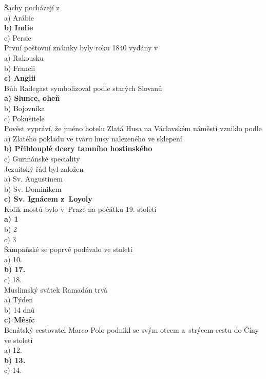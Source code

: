 \begin{multicols}{3}
\noindent
Šachy pocházejí z \\
a) Arábie\\
\textbf{b) Indie}\\
c) Persie\\

\noindent
První poštovní známky byly roku 1840 vydány v \\
a) Rakousku\\
b) Francii\\
\textbf{c) Anglii}\\

\noindent
Bůh Radegast symbolizoval podle starých Slovanů \\
\textbf{a) Slunce, oheň}\\
b) Bojovníka\\
c) Pokušitele\\

\noindent
Pověst vypráví, že jméno hotelu Zlatá Husa na Václavském náměstí 
vzniklo podle \\
a) Zlatého pokladu ve tvaru husy nalezeného ve sklepení\\
\textbf{b) Přihlouplé dcery tamního hostinského}\\
c) Gurmánské speciality\\

\noindent
Jezuitský řád byl založen \\
a) Sv. Augustinem\\
b) Sv. Dominikem\\
\textbf{c) Sv. Ignácem z~Loyoly}\\

\noindent
Kolik mostů bylo v~Praze na počátku 19. století\\
\textbf{a) 1}\\
b) 2\\
c) 3\\

\noindent
Šampaňské se poprvé podávalo ve století \\
a) 10.\\
\textbf{b) 17.}\\
c) 18.\\

\noindent
Muslimský svátek Ramadán trvá\\
a) Týden\\
b) 14 dnů\\
\textbf{c) Měsíc}\\

\noindent
Benátský cestovatel Marco Polo podnikl se svým otcem a~strýcem 
cestu do Číny ve století\\
a) 12.\\
\textbf{b) 13.}\\
c) 14.\\


\end{multicols}
